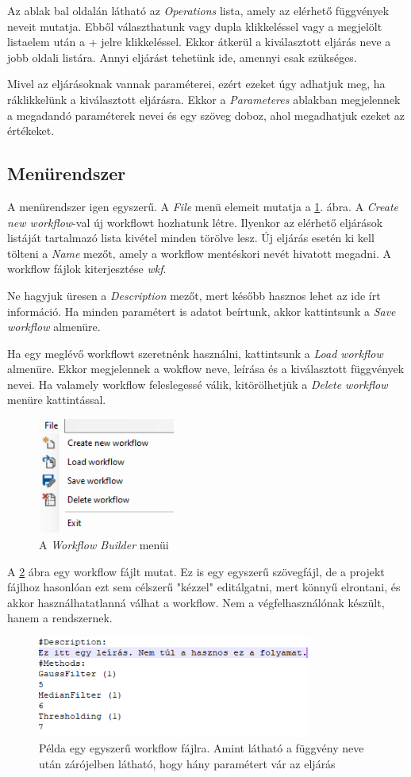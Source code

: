 \documentclass[a4paper,12pt]{book}
\begin{document}
Az ablak bal oldalán látható az \textit{Operations} lista, amely az elérhető függvények neveit mutatja. Ebből választhatunk vagy dupla klikkeléssel vagy a megjelölt listaelem után a + jelre klikkeléssel. Ekkor átkerül a kiválasztott eljárás neve a jobb oldali listára. Annyi eljárást tehetünk ide, amennyi csak szükséges.

Mivel az eljárásoknak vannak paraméterei, ezért ezeket úgy adhatjuk meg, ha ráklikkelünk a kiválasztott eljárásra. Ekkor a \textit{Parameteres} ablakban megjelennek a megadandó paraméterek nevei és egy szöveg doboz, ahol megadhatjuk ezeket az értékeket.

\subsection{Menürendszer}

A menürendszer igen egyszerű. A \textit{File} menü elemeit mutatja a \ref{fig:workflowmenu}. ábra. A \textit{Create new workflow}-val új workflowt hozhatunk létre. Ilyenkor az elérhető eljárások listáját tartalmazó lista kivétel minden törölve lesz. Új eljárás esetén ki kell tölteni a \textit{Name} mezőt, amely a workflow mentéskori nevét hivatott megadni. A workflow fájlok kiterjesztése \textit{wkf}.

Ne hagyjuk üresen a \textit{Description} mezőt, mert később hasznos lehet az ide írt információ. Ha minden paramétert is adatot beírtunk, akkor kattintsunk a \textit{Save workflow} almenüre.

Ha egy meglévő workflowt szeretnénk használni, kattintsunk a \textit{Load workflow} almenüre. Ekkor megjelennek a wokflow neve, leírása és a kiválasztott függvények nevei. 
Ha valamely workflow feleslegessé válik, kitörölhetjük a \textit{Delete workflow} menüre kattintással.

	\begin{figure}
	\centering
	\includegraphics[width=4.5cm]{workflow_menu}
	\caption{A \textit{Workflow Builder} menüi}
	\label{fig:workflowmenu}
	\end{figure}

A \ref{fig:workflowfile} ábra egy workflow fájlt mutat. Ez is egy egyszerű szövegfájl, de a projekt fájlhoz hasonlóan ezt sem célszerű "kézzel" editálgatni, mert könnyű elrontani, és akkor használhatatlanná válhat a workflow. Nem a végfelhasználónak készült, hanem a rendszernek.

	\begin{figure}[h]
	\centering
	\includegraphics[width=9cm]{workflowfile}
	\caption{Példa egy egyszerű workflow fájlra. Amint látható a függvény neve után zárójelben látható, hogy hány paramétert vár az eljárás}
	\label{fig:workflowfile}
	\end{figure}
\end{document}
